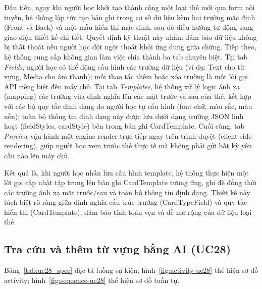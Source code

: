 Đầu tiên, ngay khi người học khởi tạo thành công một loại thẻ mới qua form nội tuyến, hệ thống lập tức tạo bản ghi trong cơ sở dữ liệu kèm hai trường mặc định (Front và Back) và một mẫu hiển thị mặc định, sau đó điều hướng tự động sang giao diện thiết kế chi tiết. Quyết định kỹ thuật này nhằm đảm bảo dữ liệu không bị thất thoát nếu người học đột ngột thoát khỏi ứng dụng giữa chừng. Tiếp theo, hệ thống cung cấp không gian làm việc chia thành ba tab chuyên biệt. Tại tab \textit{Fields}, người học có thể động cấu hình các trường dữ liệu (ví dụ: Text cho từ vựng, Media cho âm thanh); mỗi thao tác thêm hoặc xóa trường là một lời gọi API riêng biệt đến máy chủ. Tại tab \textit{Templates}, hệ thống xử lý logic ánh xạ (mapping) các trường vừa định nghĩa lên các mặt trước và sau của thẻ, kết hợp với các bộ quy tắc định dạng do người học tự cấu hình (font chữ, màu sắc, màu nền); toàn bộ thông tin định dạng này được lưu dưới dạng trường JSON linh hoạt (fieldStyles, cardStyle) bên trong bản ghi CardTemplate. Cuối cùng, tab \textit{Preview} vận hành một engine render trực tiếp ngay trên trình duyệt (client-side rendering), giúp người học xem trước thẻ thực tế mà không phải gửi bất kỳ yêu cầu nào lên máy chủ.

Kết quả là, khi người học nhấn lưu cấu hình template, hệ thống thực hiện một lời gọi cập nhật tập trung lên bản ghi CardTemplate tương ứng, ghi đè đồng thời các trường ánh xạ mặt trước/sau và toàn bộ thông tin định dạng. Thiết kế này tách biệt rõ ràng giữa định nghĩa cấu trúc trường (CardTypeField) và quy tắc hiển thị (CardTemplate), đảm bảo tính toàn vẹn và dễ mở rộng của dữ liệu loại thẻ.

\subsection{Tra cứu và thêm từ vựng bằng AI (UC28)}
Bảng~\ref{tab:uc28_spec} đặc tả luồng sự kiện; hình~\ref{fig:activity-uc28} thể hiện sơ đồ activity; hình~\ref{fig:sequence-uc28} thể hiện sơ đồ tuần tự.
